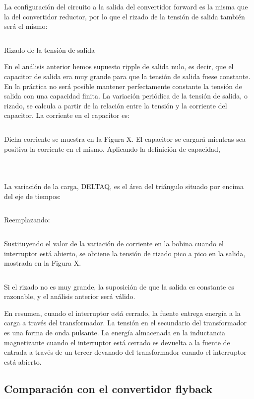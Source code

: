 

La configuración del circuito a la salida del convertidor forward es la misma que la del convertidor
reductor, por lo que el rizado de la tensión de salida también será el mismo:

$$  $$

Rizado de la tensión de salida

En el análisis anterior hemos supuesto ripple de salida nulo, es decir, que el capacitor de salida era muy grande para que la tensión
de salida fuese constante. En la práctica no será posible mantener perfectamente constante la
tensión de salida con una capacidad finita. La variación periódica de la tensión de salida, o rizado,
se calcula a partir de la relación entre la tensión y la corriente del capacitor. 
La corriente en el capacitor es:

$$  $$

Dicha corriente se muestra en la Figura X. El capacitor se cargará mientras sea positiva la corriente en el mismo. Aplicando la definición
de capacidad,

$$  $$

$$  $$

$$  $$

La variación de la carga, DELTAQ, es el área del triángulo situado por encima del eje de tiempos:

$$  $$

Reemplazando:

$$  $$

Sustituyendo el valor de la variación de corriente en la bobina cuando el interruptor está abierto, 
se obtiene la tensión de rizado pico a pico en la salida, mostrada en la Figura X.

$$  $$

Si el rizado no es muy grande, la suposición de que la salida es constante es razonable, y el
análisis anterior será válido.


En resumen, cuando el interruptor está cerrado, la fuente entrega energía a la carga a través del transformador.
La tensión en el secundario del transformador es una forma de onda pulsante. La energía almacenada en
la inductancia magnetizante cuando el interruptor está cerrado es devuelta a la fuente de
entrada a través de un tercer devanado del transformador cuando el interruptor está abierto.

\subsection{Comparación con el convertidor flyback}

